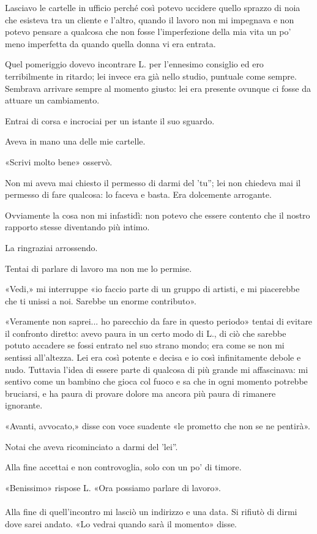 \documentclass[a4paper,12pt]{book}
\begin{document}
Lasciavo le cartelle in ufficio perché così potevo uccidere quello sprazzo di
noia che esisteva tra un cliente e l'altro, quando il lavoro non mi impegnava
e non potevo pensare a qualcosa che non fosse l'imperfezione della mia vita
un po' meno imperfetta da quando quella donna vi era entrata.

Quel pomeriggio dovevo incontrare L. per l'ennesimo consiglio ed ero
terribilmente in ritardo; lei invece era già nello studio, puntuale come
sempre. Sembrava arrivare sempre al momento giusto: lei era presente ovunque ci
fosse da attuare un cambiamento.

Entrai di corsa e incrociai per un istante il suo sguardo.

Aveva in mano una delle mie cartelle.

«Scrivi molto bene» osservò.

Non mi aveva mai chiesto il permesso di darmi del 'tu''; lei non chiedeva mai
il permesso di fare qualcosa: lo faceva e basta. Era dolcemente arrogante.

Ovviamente la cosa non mi infastidì: non potevo che essere contento che il
nostro rapporto stesse diventando più intimo.

La ringraziai arrossendo.

Tentai di parlare di lavoro ma non me lo permise.

«Vedi,» mi interruppe «io faccio parte di un gruppo di artisti, e mi
piacerebbe che ti unissi a noi. Sarebbe un enorme contributo».

«Veramente non saprei... ho parecchio da fare in questo periodo» tentai di
evitare il confronto diretto: avevo paura in un certo modo di L., di ciò che
sarebbe potuto accadere se fossi entrato nel suo strano mondo; era come se non
mi sentissi all'altezza. Lei era così potente e decisa e io così infinitamente
debole e nudo. Tuttavia l'idea di essere parte di qualcosa di più grande mi
affascinava: mi sentivo come un bambino che gioca col fuoco e sa che in ogni
momento potrebbe bruciarsi, e ha paura di provare dolore ma ancora più paura di
rimanere ignorante.

«Avanti, avvocato,» disse con voce suadente «le prometto che non se ne
pentirà».

Notai che aveva ricominciato a darmi del 'lei''.

Alla fine accettai e non controvoglia, solo con un po' di timore.

«Benissimo» rispose L. «Ora possiamo parlare di lavoro».

\paragraph{}
Alla fine di quell'incontro mi lasciò un indirizzo e una data. Si rifiutò di
dirmi dove sarei andato. «Lo vedrai quando sarà il momento» disse.
\end{document}
